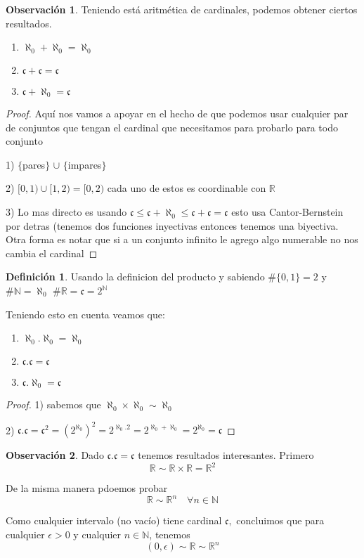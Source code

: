 \documentclass[12pt]{article}
\newcommand{\n}{\aleph_{0}}
\newcommand{\R}{\mathbb{R}}
\newcommand{\N}{\mathbb{N}}
\theoremstyle{definition}
\newtheorem{definition}{Definición}[section]
\newtheorem*{remark}{Observación}
\begin{document}
\begin{remark}
  Teniendo está aritmética de cardinales, podemos obtener ciertos resultados.

 \begin{enumerate}
      \item $\n + \n = \n$   
      \item $\mathfrak{c} + \mathfrak{c} = \mathfrak{c}$ 
      \item$ \mathfrak{c} + \n = \mathfrak{c}$
      \end{enumerate}
      
  \begin{proof}
    Aquí nos vamos a apoyar en el hecho de que podemos usar cualquier par de conjuntos que tengan el cardinal que necesitamos para probarlo para todo conjunto

  1) $\{$pares$\}$ $\cup$ $\{$impares$\}$

2) $[0,1) \cup [1,2) = [0,2)$ cada uno de estos es coordinable con $\R$

3) Lo mas directo es usando $\mathfrak{c} \leq \mathfrak{c} + \n \leq \mathfrak{c} + \mathfrak{c} = \mathfrak{c}$ esto usa Cantor-Bernstein por detras (tenemos dos funciones inyectivas entonces tenemos una biyectiva. Otra forma es notar que si a un conjunto infinito le agrego algo numerable no nos cambia el cardinal
    
  \end{proof}

\end{remark}

\begin{definition}
  Usando la definicion del producto y sabiendo $\# \{0,1\} = 2$ y $\# \N = \n$
  $\# \R = \mathfrak{c} = 2^{\N}$ 

  Teniendo esto en cuenta veamos que:

  \begin{enumerate}
    \item $\n.\n = \n$
    \item $\mathfrak{c}.\mathfrak{c} = \mathfrak{c}$
    \item $\mathfrak{c}.\n = \mathfrak{c}$
    \end{enumerate}

    \begin{proof}
    1) sabemos que $\n \times \n \sim \n$

  2) $\mathfrak{c}.\mathfrak{c} = \mathfrak{c}^2 = (2^{\n})^2 = 2^{\n.2} = 2^{\n + \n} = 2 ^{\n} = \mathfrak{c}$
  \end{proof} 
\end{definition}

\begin{remark}
  Dado $\mathfrak{c}.\mathfrak{c} = \mathfrak{c}$ tenemos resultados interesantes. 
  Primero $$\R \sim \R \times \R = \R^2$$

  De la misma manera pdoemos probar $$\R \sim \R^n \quad \forall n \in \N $$

Como cualquier intervalo (no vacío) tiene cardinal $\mathfrak{c},$ concluimos que para cualquier $\epsilon > 0$ y cualquier $n \in \N$, tenemos $$(0,\epsilon)\sim \R \sim \R^n$$
\end{remark}
\end{document}
